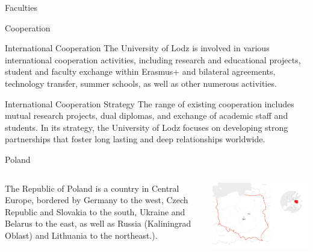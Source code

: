 \documentclass[hyperref={pdfpagemode=FullScreen}]{beamer}
\begin{document}
\begin{frame}{Faculties}
\begin{multicols}{2}
\end{multicols}
\end{frame}


\begin{frame}{Cooperation}
\begin{block}{International Cooperation}
The University of Lodz is involved in various international cooperation activities, including research and educational projects, student and faculty exchange within Erasmus+ and bilateral agreements, technology transfer, summer schools, as well as other numerous activities.
\end{block}
\begin{block}{International Cooperation Strategy}
 The range of existing cooperation includes mutual research projects, dual diplomas, and exchange of academic staff and students. In its strategy, the University of Lodz focuses on developing strong partnerships that foster long lasting and deep relationships worldwide.
\end{block}
\end{frame}


\begin{frame}{Poland}
\begin{columns}

\begin{column}{.5\textwidth}
\justifying The Republic of Poland is a country in Central Europe, bordered by Germany to the west, Czech Republic and Slovakia to the south, Ukraine and Belarus to the east, as well as Russia (Kaliningrad Oblast) and Lithuania to the northeast.).
\end{column}

\begin{column}{.5\textwidth}
\includegraphics[scale=.30]{img/pic3.png}
\end{column}

\end{columns}
\end{frame}
\end{document}
